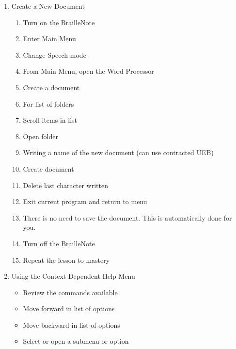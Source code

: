 \documentclass[10pt,letterpaper,twoside]{report}
\begin{document}
\begin{enumerate}
	\item Create a New Document
	      \begin{enumerate}
		      \item Turn on the BrailleNote 
		      \item Enter Main Menu 
		      \item Change Speech mode 
		      \item From Main Menu, open the Word Processor 
		      \item Create a document 
		      \item For list of folders 
		      \item Scroll items in list 
		      \item Open folder 
		      \item Writing a name of the new document (can use contracted UEB)
		      \item Create document 
		      \item Delete last character written 
		      \item Exit current program and return to menu 
		      \item There is no need to save the document. This is automatically done for you.
		      \item Turn off the BrailleNote 
		      \item Repeat the lesson to mastery
	      \end{enumerate}
	\item Using the Context Dependent Help Menu
	      \begin{itemize}
		      \item Review the commands available 
		      \item Move forward in list of options 
		      \item Move backward in list of options 
		      \item Select or open a submenu or option 
	      \end{itemize}
\end{enumerate}
\end{document}
